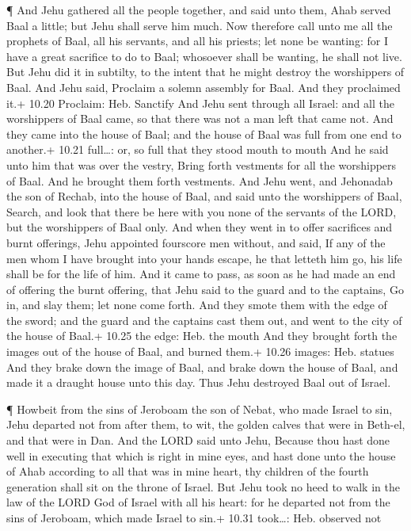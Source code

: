  ¶ And Jehu gathered all the people together, and said unto
them, Ahab served Baal a little; but Jehu shall serve him much.
 Now therefore call unto me all the prophets of Baal, all
his servants, and all his priests; let none be wanting: for I have a
great sacrifice to do to Baal; whosoever shall be wanting, he shall not
live. But Jehu did it in subtilty, to the intent that he might destroy
the worshippers of Baal.  And Jehu said, Proclaim a solemn
assembly for Baal. And they proclaimed it.+ 10.20 Proclaim: Heb.
Sanctify  And Jehu sent through all Israel: and all the
worshippers of Baal came, so that there was not a man left that came
not. And they came into the house of Baal; and the house of Baal was
full from one end to another.+ 10.21 full\ldots: or, so full that they
stood mouth to mouth  And he said unto him that was over
the vestry, Bring forth vestments for all the worshippers of Baal. And
he brought them forth vestments.  And Jehu went, and
Jehonadab the son of Rechab, into the house of Baal, and said unto the
worshippers of Baal, Search, and look that there be here with you none
of the servants of the LORD, but the worshippers of Baal only.
 And when they went in to offer sacrifices and burnt
offerings, Jehu appointed fourscore men without, and said, If any of the
men whom I have brought into your hands escape, he that letteth him go,
his life shall be for the life of him.  And it came to
pass, as soon as he had made an end of offering the burnt offering, that
Jehu said to the guard and to the captains, Go in, and slay them; let
none come forth. And they smote them with the edge of the sword; and the
guard and the captains cast them out, and went to the city of the house
of Baal.+ 10.25 the edge: Heb. the mouth  And they brought
forth the images out of the house of Baal, and burned them.+ 10.26
images: Heb. statues  And they brake down the image of
Baal, and brake down the house of Baal, and made it a draught house unto
this day.  Thus Jehu destroyed Baal out of Israel.

 ¶ Howbeit from the sins of Jeroboam the son of Nebat, who
made Israel to sin, Jehu departed not from after them, to wit, the
golden calves that were in Beth-el, and that were in Dan. 
And the LORD said unto Jehu, Because thou hast done well in executing
that which is right in mine eyes, and hast done unto the house of Ahab
according to all that was in mine heart, thy children of the fourth
generation shall sit on the throne of Israel.  But Jehu
took no heed to walk in the law of the LORD God of Israel with all his
heart: for he departed not from the sins of Jeroboam, which made Israel
to sin.+ 10.31 took\ldots: Heb. observed not

